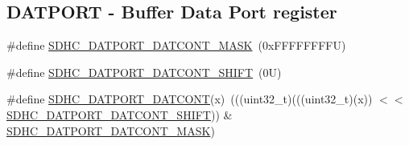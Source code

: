 \subsection*{D\+A\+T\+P\+O\+RT -\/ Buffer Data Port register}
\begin{DoxyCompactItemize}
\item 
\#define \mbox{\hyperlink{group___s_d_h_c___register___masks_gad3095c85c287cb31fd4cd815f8516213}{S\+D\+H\+C\+\_\+\+D\+A\+T\+P\+O\+R\+T\+\_\+\+D\+A\+T\+C\+O\+N\+T\+\_\+\+M\+A\+SK}}~(0x\+F\+F\+F\+F\+F\+F\+F\+F\+U)
\item 
\#define \mbox{\hyperlink{group___s_d_h_c___register___masks_ga8d1d79a58015eaa7fe8f8dc6f3655781}{S\+D\+H\+C\+\_\+\+D\+A\+T\+P\+O\+R\+T\+\_\+\+D\+A\+T\+C\+O\+N\+T\+\_\+\+S\+H\+I\+FT}}~(0\+U)
\item 
\#define \mbox{\hyperlink{group___s_d_h_c___register___masks_gaa6e82dc6e7cf2202094a103b0006ba05}{S\+D\+H\+C\+\_\+\+D\+A\+T\+P\+O\+R\+T\+\_\+\+D\+A\+T\+C\+O\+NT}}(x)~(((uint32\+\_\+t)(((uint32\+\_\+t)(x)) $<$$<$ \mbox{\hyperlink{group___s_d_h_c___register___masks_ga8d1d79a58015eaa7fe8f8dc6f3655781}{S\+D\+H\+C\+\_\+\+D\+A\+T\+P\+O\+R\+T\+\_\+\+D\+A\+T\+C\+O\+N\+T\+\_\+\+S\+H\+I\+FT}})) \& \mbox{\hyperlink{group___s_d_h_c___register___masks_gad3095c85c287cb31fd4cd815f8516213}{S\+D\+H\+C\+\_\+\+D\+A\+T\+P\+O\+R\+T\+\_\+\+D\+A\+T\+C\+O\+N\+T\+\_\+\+M\+A\+SK}})
\end{DoxyCompactItemize}
